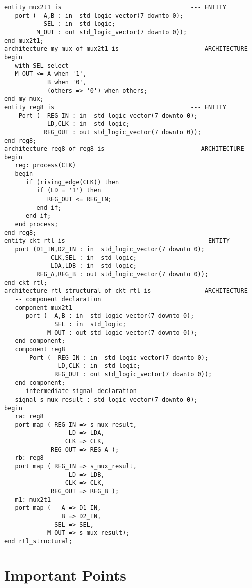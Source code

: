 \noindent
\begin{minipage}{0.99\linewidth}
\begin{lstlisting}[label=ex25_code, caption=Solution to Example 25 using a structural modeling approach.]
entity mux2t1 is                                    --- ENTITY
   port (  A,B : in  std_logic_vector(7 downto 0); 
           SEL : in  std_logic; 
         M_OUT : out std_logic_vector(7 downto 0)); 
end mux2t1; 
architecture my_mux of mux2t1 is                    --- ARCHITECTURE
begin 
   with SEL select
   M_OUT <= A when '1', 
            B when '0', 
            (others => '0') when others; 
end my_mux;
entity reg8 is                                      --- ENTITY
    Port (  REG_IN : in  std_logic_vector(7 downto 0);
            LD,CLK : in  std_logic;
           REG_OUT : out std_logic_vector(7 downto 0));
end reg8;
architecture reg8 of reg8 is                       --- ARCHITECTURE
begin
   reg: process(CLK)
   begin
      if (rising_edge(CLK)) then 
         if (LD = '1') then 
            REG_OUT <= REG_IN; 
         end if;
      end if;
   end process; 
end reg8;
entity ckt_rtl is                                    --- ENTITY
   port (D1_IN,D2_IN : in  std_logic_vector(7 downto 0);
             CLK,SEL : in  std_logic; 
             LDA,LDB : in  std_logic; 
         REG_A,REG_B : out std_logic_vector(7 downto 0)); 
end ckt_rtl; 
architecture rtl_structural of ckt_rtl is           --- ARCHITECTURE
   -- component declaration
   component mux2t1 
      port (  A,B : in  std_logic_vector(7 downto 0); 
              SEL : in  std_logic; 
            M_OUT : out std_logic_vector(7 downto 0)); 
   end component;
   component reg8 
       Port (  REG_IN : in  std_logic_vector(7 downto 0);
               LD,CLK : in  std_logic;
              REG_OUT : out std_logic_vector(7 downto 0));
   end component;
   -- intermediate signal declaration
   signal s_mux_result : std_logic_vector(7 downto 0); 	
begin
   ra: reg8
   port map ( REG_IN => s_mux_result,
                  LD => LDA,
                 CLK => CLK,
             REG_OUT => REG_A ); 
   rb: reg8
   port map ( REG_IN => s_mux_result,
                  LD => LDB,
                 CLK => CLK,
             REG_OUT => REG_B ); 			 
   m1: mux2t1
   port map (   A => D1_IN, 
                B => D2_IN,
              SEL => SEL,
            M_OUT => s_mux_result); 				 
end rtl_structural;
\end{lstlisting}
\end{minipage}

\section{Important Points}

